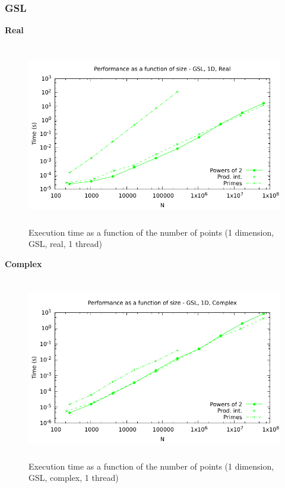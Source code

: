 \documentclass[12pt, a4paper]{article}
\begin{document}
\subsubsection{GSL}
{\bf Real}
\begin{figure}[H]
\captionsetup{width=0.6\textwidth}
\centering
\includegraphics[height=8cm]{graphs/performance/1d-gsl-r.pdf}
\caption{Execution time as a function of the number of points (1 dimension, GSL, real, 1 thread)}
\label{1DGSLR}
\end{figure}
{\bf Complex}
\begin{figure}[H]
\captionsetup{width=0.6\textwidth}
\centering
\includegraphics[height=8cm]{graphs/performance/1d-gsl-c.pdf}
\caption{Execution time as a function of the number of points (1 dimension, GSL, complex, 1 thread)}
\label{1DGSLC}
\end{figure}   
\end{document}
